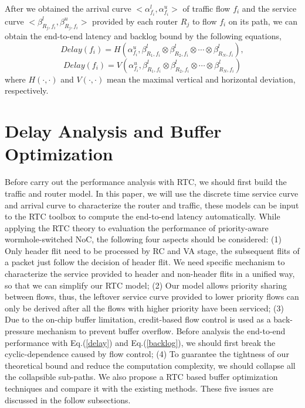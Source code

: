 \documentclass[10pt,journal]{IEEEtran}
\begin{document}
After we obtained the arrival curve $<\alpha^l_{f_i},\alpha^u_{f_i}>$ of traffic flow $f_i$ and the service curve $<\beta_{R_j,f_i}^l,\beta_{R_j,f_i}^u>$ provided by each router $R_j$ to flow $f_i$ on its path, we can obtain the end-to-end latency and backlog bound by the following equations,
\begin{equation}\label{delay}
Delay(f_i)=H(\alpha^u_{f_i},\beta^l_{R_1,f_i}\otimes\beta^l_{R_2,f_i}\otimes\cdots\otimes\beta^l_{R_N,f_i}),
\end{equation}
\begin{equation}\label{backlog}
Delay(f_i)=V(\alpha^u_{f_i},\beta^l_{R_1,f_i}\otimes\beta^l_{R_2,f_i}\otimes\cdots\otimes\beta^l_{R_N,f_i})
\end{equation}
where $H(\cdot,\cdot)$ and $V(\cdot,\cdot)$ mean the maximal vertical and horizontal deviation, respectively.

\section{Delay Analysis and Buffer Optimization}\label{modeling}
Before carry out the performance analysis with RTC, we should first build the traffic and router model. In this paper, we will use the discrete time service curve and arrival curve to characterize the router and traffic, these models can be input to the RTC toolbox \cite{rtc} to compute the end-to-end latency automatically. While applying the RTC theory to evaluation the performance of priority-aware wormhole-switched NoC, the following four aspects should be considered: (1) Only header flit need to be processed by RC and VA stage, the subsequent flits of a packet just follow the decision of header flit. We need specific mechanism to characterize the service provided to header and non-header flits in a unified way, so that we can simplify our RTC model; (2) Our model allows priority sharing between flows, thus, the leftover service curve provided to lower priority flows can only be derived after all the flows with higher priority have been serviced; (3) Due to the on-chip buffer limitation, credit-based flow control is used as a back-pressure mechanism to prevent buffer overflow. Before analysis the end-to-end performance with Eq.(\ref{delay}) and Eq.(\ref{backlog}), we should first break the cyclic-dependence caused by flow control; (4) To guarantee the tightness of our theoretical bound and reduce the computation complexity, we should collapse all the collapsible sub-paths. We also propose a RTC based buffer optimization techniques and compare it with the existing methods. These five issues are discussed in the follow subsections.
\end{document}
